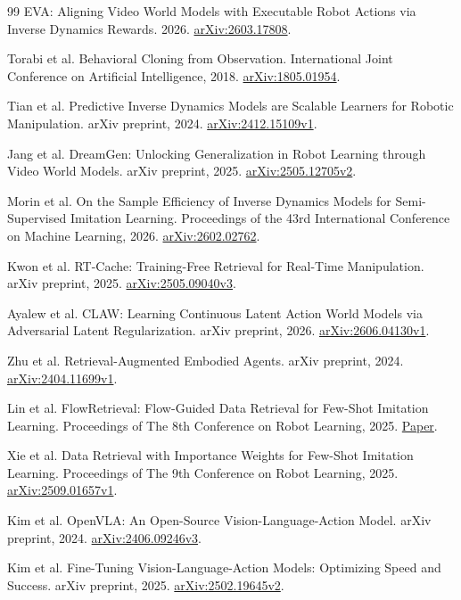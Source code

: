 \documentclass[11pt,a4paper]{article}
\begin{document}
\begin{thebibliography}{99}
EVA: Aligning Video World Models with Executable Robot Actions via Inverse Dynamics Rewards. 2026. \href{https://arxiv.org/abs/2603.17808}{arXiv:2603.17808}.

Torabi et al. Behavioral Cloning from Observation. International Joint Conference on Artificial Intelligence, 2018. \href{https://arxiv.org/abs/1805.01954}{arXiv:1805.01954}.

Tian et al. Predictive Inverse Dynamics Models are Scalable Learners for Robotic Manipulation. arXiv preprint, 2024. \href{https://arxiv.org/abs/2412.15109v1}{arXiv:2412.15109v1}.

Jang et al. DreamGen: Unlocking Generalization in Robot Learning through Video World Models. arXiv preprint, 2025. \href{https://arxiv.org/abs/2505.12705v2}{arXiv:2505.12705v2}.

Morin et al. On the Sample Efficiency of Inverse Dynamics Models for Semi-Supervised Imitation Learning. Proceedings of the 43rd International Conference on Machine Learning, 2026. \href{https://arxiv.org/abs/2602.02762}{arXiv:2602.02762}.

Kwon et al. RT-Cache: Training-Free Retrieval for Real-Time Manipulation. arXiv preprint, 2025. \href{https://arxiv.org/abs/2505.09040v3}{arXiv:2505.09040v3}.

Ayalew et al. CLAW: Learning Continuous Latent Action World Models via Adversarial Latent Regularization. arXiv preprint, 2026. \href{https://arxiv.org/abs/2606.04130v1}{arXiv:2606.04130v1}.

Zhu et al. Retrieval-Augmented Embodied Agents. arXiv preprint, 2024. \href{https://arxiv.org/abs/2404.11699v1}{arXiv:2404.11699v1}.

Lin et al. FlowRetrieval: Flow-Guided Data Retrieval for Few-Shot Imitation Learning. Proceedings of The 8th Conference on Robot Learning, 2025. \href{https://proceedings.mlr.press/v270/lin25a.html}{Paper}.

Xie et al. Data Retrieval with Importance Weights for Few-Shot Imitation Learning. Proceedings of The 9th Conference on Robot Learning, 2025. \href{https://arxiv.org/abs/2509.01657v1}{arXiv:2509.01657v1}.

Kim et al. OpenVLA: An Open-Source Vision-Language-Action Model. arXiv preprint, 2024. \href{https://arxiv.org/abs/2406.09246v3}{arXiv:2406.09246v3}.

Kim et al. Fine-Tuning Vision-Language-Action Models: Optimizing Speed and Success. arXiv preprint, 2025. \href{https://arxiv.org/abs/2502.19645v2}{arXiv:2502.19645v2}.


\end{thebibliography}
\end{document}
